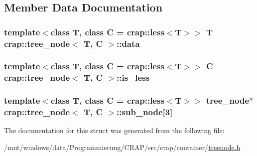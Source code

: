 \subsection{Member Data Documentation}
\hypertarget{structcrap_1_1tree__node_a118a7c8c8e975f1af0bdac99bb6f875a}{
\subsubsection[{data}]{\setlength{\rightskip}{0pt plus 5cm}template$<$class T, class C = crap\-::less$<$\-T$>$$>$ T {\bf crap\-::tree\-\_\-node}$<$ T, C $>$\-::data}}\label{structcrap_1_1tree__node_a118a7c8c8e975f1af0bdac99bb6f875a}
\hypertarget{structcrap_1_1tree__node_af2196765b0e5f1e668f3d05ac006f63a}{
\subsubsection[{is\-\_\-less}]{\setlength{\rightskip}{0pt plus 5cm}template$<$class T, class C = crap\-::less$<$\-T$>$$>$ C {\bf crap\-::tree\-\_\-node}$<$ T, C $>$\-::is\-\_\-less}}\label{structcrap_1_1tree__node_af2196765b0e5f1e668f3d05ac006f63a}
\hypertarget{structcrap_1_1tree__node_a437e16f20801c1c5bded5883f9b10c45}{
\subsubsection[{sub\-\_\-node}]{\setlength{\rightskip}{0pt plus 5cm}template$<$class T, class C = crap\-::less$<$\-T$>$$>$ {\bf tree\-\_\-node}$\ast$ {\bf crap\-::tree\-\_\-node}$<$ T, C $>$\-::sub\-\_\-node\mbox{[}3\mbox{]}}}\label{structcrap_1_1tree__node_a437e16f20801c1c5bded5883f9b10c45}


The documentation for this struct was generated from the following file\-:\begin{DoxyCompactItemize}
\item 
/mnt/windows/data/\-Programmierung/\-C\-R\-A\-P/src/crap/container/\hyperlink{treenode_8h}{treenode.\-h}\end{DoxyCompactItemize}
